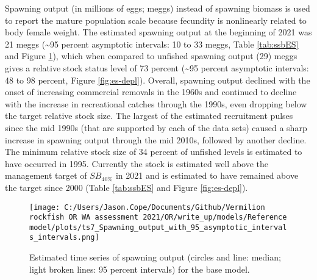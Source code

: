 \documentclass[11pt,
  english,
  a4paper,
]{article}
\begin{document}
\leavevmode\tagmcend\tagstructend


Spawning output (in millions of eggs; meggs) instead of spawning biomass is used to report the mature population scale because fecundity is nonlinearly related to body female weight. The estimated spawning output at the beginning of 2021 was 21 meggs (\textasciitilde95 percent asymptotic intervals: 10 to 33 meggs, Table \ref{tab:ssbES} and Figure \ref{fig:es-ssb}), which when compared to unfished spawning output (29) meggs gives a relative stock status level of 73 percent (\textasciitilde95 percent asymptotic intervals: 48 to 98 percent, Figure \ref{fig:es-depl}). Overall, spawning output declined with the onset of increasing commercial removals in the 1960s and continued to decline with the increase in recreational catches through the 1990s, even dropping below the target relative stock size. The largest of the estimated recruitment pulses since the mid 1990s (that are supported by each of the data sets) caused a sharp increase in spawning output through the mid 2010s, followed by another decline. The minimum relative stock size of 34 percent of unfished levels is estimated to have occurred in 1995. Currently the stock is estimated well above the management target of {\(SB_{40\%}\)\leavevmode\tagmcend\tagstructend} in 2021 and is estimated to have remained above the target since 2000 (Table \ref{tab:ssbES} and Figure \ref{fig:es-depl}).

\leavevmode\tagmcend\tagstructend\par




\begin{figure}
\centering
\texttt{[image: C:/Users/Jason.Cope/Documents/Github/Vermilion rockfish OR WA assessment 2021/OR/write\_up/models/Reference model/plots/ts7\_Spawning\_output\_with\_95\_asymptotic\_intervals\_intervals.png]}
\caption{Estimated time series of spawning output (circles and line: median; light broken lines: 95 percent intervals) for the base model.\label{fig:es-ssb}}
\end{figure}

\tagmcend\tagstructend
\end{document}
